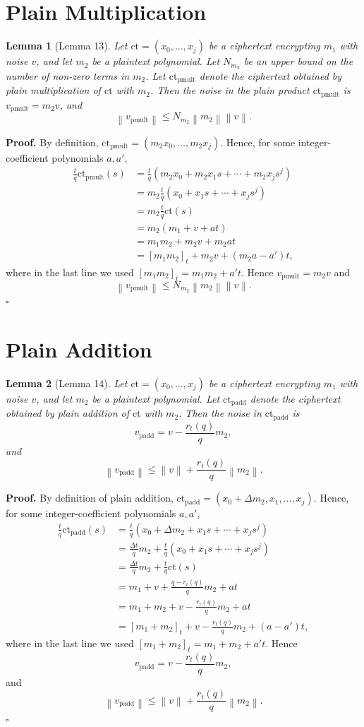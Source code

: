 \documentclass[11pt]{article}
\newtheorem{lemma}{Lemma}
\newcommand{\norm}[1]{\left\lVert #1\right\rVert}
\newcommand{\ct}{\mathrm{ct}}
\newcommand{\ctpmult}{\mathrm{ct}_{\mathrm{pmult}}}
\newcommand{\ctpadd}{\mathrm{ct}_{\mathrm{padd}}}
\newcommand{\vpmult}{v_{\mathrm{pmult}}}
\newcommand{\vpadd}{v_{\mathrm{padd}}}
\begin{document}
\section*{Plain Multiplication}

\begin{lemma}[Lemma 13]
Let $\ct=(x_0,\ldots,x_j)$ be a ciphertext encrypting $m_1$ with
noise $v$, and let $m_2$ be a plaintext polynomial. Let $N_{m_2}$
be an upper bound on the number of non-zero terms in $m_2$.
Let $\ctpmult$ denote the ciphertext obtained by plain multiplication
of $\ct$ with $m_2$. Then the noise in the plain product $\ctpmult$
is $\vpmult=m_2v$, and
\[
  \norm{\vpmult}\leq N_{m_2}\norm{m_2}\norm{v}.
\]
\end{lemma}

\textbf{Proof.}
By definition, $\ctpmult=(m_2x_0,\ldots,m_2x_j)$. Hence, for some
integer-coefficient polynomials $a,a'$,
\begin{align*}
\frac{t}{q}\ctpmult(s)
&=\frac{t}{q}(m_2x_0+m_2x_1s+\cdots+m_2x_js^j)\\
&=m_2\frac{t}{q}(x_0+x_1s+\cdots+x_js^j)\\
&=m_2\frac{t}{q}\ct(s)\\
&=m_2(m_1+v+at)\\
&=m_1m_2+m_2v+m_2at\\
&=[m_1m_2]_t+m_2v+(m_2a-a')t,
\end{align*}
where in the last line we used $[m_1m_2]_t=m_1m_2+a't$.
Hence $\vpmult=m_2v$ and
\[
  \norm{\vpmult}\leq N_{m_2}\norm{m_2}\norm{v}.
\]
\hfill$\square$

\section*{Plain Addition}

\begin{lemma}[Lemma 14]
Let $\ct=(x_0,\ldots,x_j)$ be a ciphertext encrypting $m_1$ with
noise $v$, and let $m_2$ be a plaintext polynomial. Let $\ctpadd$
denote the ciphertext obtained by plain addition of $\ct$ with $m_2$.
Then the noise in $\ctpadd$ is
\[
  \vpadd=v-\frac{r_t(q)}{q}m_2,
\]
and
\[
  \norm{\vpadd}\leq \norm{v}+\frac{r_t(q)}{q}\norm{m_2}.
\]
\end{lemma}

\textbf{Proof.}
By definition of plain addition,
$\ctpadd=(x_0+\Delta m_2,x_1,\ldots,x_j)$. Hence, for some
integer-coefficient polynomials $a,a'$,
\begin{align*}
\frac{t}{q}\ctpadd(s)
&=\frac{t}{q}(x_0+\Delta m_2+x_1s+\cdots+x_js^j)\\
&=\frac{\Delta t}{q}m_2+\frac{t}{q}(x_0+x_1s+\cdots+x_js^j)\\
&=\frac{\Delta t}{q}m_2+\frac{t}{q}\ct(s)\\
&=m_1+v+\frac{q-r_t(q)}{q}m_2+at\\
&=m_1+m_2+v-\frac{r_t(q)}{q}m_2+at\\
&=[m_1+m_2]_t+v-\frac{r_t(q)}{q}m_2+(a-a')t,
\end{align*}
where in the last line we used
$[m_1+m_2]_t=m_1+m_2+a't$. Hence
\[
  \vpadd=v-\frac{r_t(q)}{q}m_2,
\]
and
\[
  \norm{\vpadd}\leq \norm{v}+\frac{r_t(q)}{q}\norm{m_2}.
\]
\hfill$\square$
\end{document}
